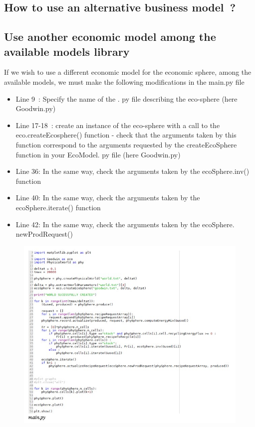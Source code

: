 \documentclass[12pt,a4paper]{article}%
\begin{document}
\begin{appendix}
	\section{How to use an alternative business model~?}
\subsection{Use another economic model among the available models library} 
If we wish to use a different economic model for the economic sphere, among the available models, we must make the following modifications in the main.py file 
\begin{itemize} 
	\item Line 9~: Specify the name of the . py file describing the eco-sphere (here Goodwin.py) 
	\item Line 17-18~: create an instance of the eco-sphere with a call to the eco.createEcosphere() function - check that the arguments taken by this function correspond to the arguments requested by the createEcoSphere function in your EcoModel. py file (here Goodwin.py) 
	\item Line 36: In the same way, check the arguments taken by the ecoSphere.inv() function 
	\item Line 40: In the same way, check the arguments taken by the ecoSphere.iterate() function 
	\item Line 42: In the same way, check the arguments taken by the ecoSphere. newProdRequest() 
\end{itemize} 
\begin{figure}[h] 
	\centering 
	\includegraphics[width=1.0\textwidth]{figures/Main-py.jpg} 
\end{figure} 


\end{appendix}
\end{document}
